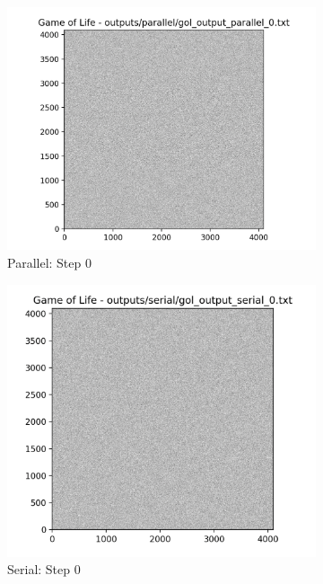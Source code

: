 \documentclass[a4paper,10pt]{article}
\begin{document}
\begin{figure}
\centering
\begin{subfigure}{0.4\textwidth}
    \includegraphics[width=\textwidth]{img/bonus/parallel_0.png}
    \caption{Parallel: Step 0}
\end{subfigure}
\hfill
\begin{subfigure}{0.4\textwidth}
    \includegraphics[width=\textwidth]{img/bonus/serial_0.png}
    \caption{Serial: Step 0}
\end{subfigure}
\hfill
\begin{subfigure}{0.4\textwidth}

\end{subfigure}
\end{figure}
\end{document}
